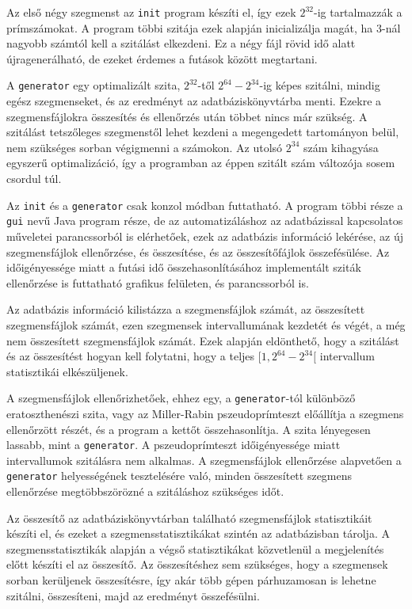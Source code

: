 Az első négy szegmenst az \texttt{init} program készíti el, így ezek $2^{32}$-ig tartalmazzák a prímszámokat.
A program többi szitája ezek alapján inicializálja magát, ha $3$-nál nagyobb számtól kell a szitálást elkezdeni.
Ez a négy fájl rövid idő alatt újragenerálható, de ezeket érdemes a futások között megtartani.

A \texttt{generator} egy optimalizált szita, $2^{32}$-től $2^{64}-2^{34}$-ig képes szitálni, mindig egész szegmenseket, és az eredményt az adatbáziskönyvtárba menti.
Ezekre a szegmensfájlokra összesítés és ellenőrzés után többet nincs már szükség.
A szitálást tetszőleges szegmenstől lehet kezdeni a megengedett tartományon belül, nem szükséges sorban végigmenni a számokon.
Az utolsó $2^{34}$ szám kihagyása egyszerű optimalizáció, így a programban az éppen szitált szám változója sosem csordul túl.

Az \texttt{init} és a \texttt{generator} csak konzol módban futtatható.
A program többi része a \texttt{gui} nevű Java program része, de az automatizáláshoz az adatbázissal kapcsolatos műveletei parancssorból is elérhetőek, ezek az adatbázis információ lekérése, az új szegmensfájlok ellenőrzése, és összesítése, és az összesítőfájlok összefésülése.
Az időigényessége miatt a futási idő összehasonlításához implementált sziták ellenőrzése is futtatható grafikus felületen, és parancssorból is.

Az adatbázis információ kilistázza a szegmensfájlok számát, az összesített szegmensfájlok számát, ezen szegmensek intervallumának kezdetét és végét, a még nem összesített szegmensfájlok számát.
Ezek alapján eldönthető, hogy a szitálást és az összesítést hogyan kell folytatni, hogy a teljes $[1, 2^{64}-2^{34}[$ intervallum statisztikái elkészüljenek.

A szegmensfájlok ellenőrizhetőek, ehhez egy, a \texttt{generator}-tól különböző eratoszthenészi szita, vagy az Miller-Rabin pszeudoprímteszt\cite{miller} előállítja a szegmens ellenőrzött részét, és a program a kettőt összehasonlítja.
A szita lényegesen lassabb, mint a \texttt{generator}.
A pszeudoprímteszt időigényessége miatt intervallumok szitálásra nem alkalmas.
A szegmensfájlok ellenőrzése alapvetően a \texttt{generator} helyességének tesztelésére való, minden összesített szegmens ellenőrzése megtöbbszörözné a szitáláshoz szükséges időt.

Az összesítő az adatbáziskönyvtárban található szegmensfájlok statisztikáit készíti el, és ezeket a szegmensstatisztikákat szintén az adatbázisban tárolja.
A szegmensstatisztikák alapján a végső statisztikákat közvetlenül a megjelenítés előtt készíti el az összesítő.
Az összesítéshez sem szükséges, hogy a szegmensek sorban kerüljenek összesítésre, így akár több gépen párhuzamosan is lehetne szitálni, összesíteni, majd az eredményt összefésülni.

